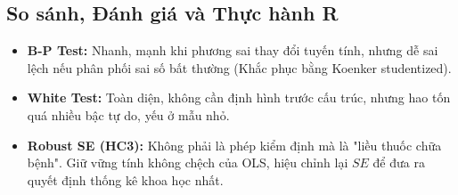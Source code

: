 \documentclass[12pt, a4paper]{article}
\begin{document}
	\subsection{So sánh, Đánh giá và Thực hành R}
	\begin{itemize}
		\item \textbf{B-P Test:} Nhanh, mạnh khi phương sai thay đổi tuyến tính, nhưng dễ sai lệch nếu phân phối sai số bất thường (Khắc phục bằng Koenker studentized).
		\item \textbf{White Test:} Toàn diện, không cần định hình trước cấu trúc, nhưng hao tốn quá nhiều bậc tự do, yếu ở mẫu nhỏ.
		\item \textbf{Robust SE (HC3):} Không phải là phép kiểm định mà là "liều thuốc chữa bệnh". Giữ vững tính không chệch của OLS, hiệu chỉnh lại $SE$ để đưa ra quyết định thống kê khoa học nhất.
	\end{itemize}
	
\end{document}
